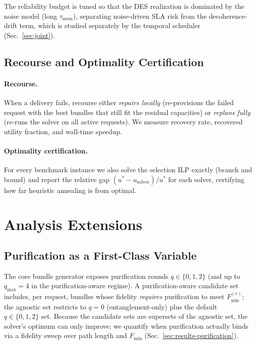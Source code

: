 \documentclass[10pt,a4paper]{article}
\begin{document}
The reliability budget is tuned so that the DES realization is
dominated by the noise model (long $\tau_{\text{mem}}$), separating
noise-driven SLA risk from the decoherence-drift term, which is
studied separately by the temporal scheduler (Sec.~\ref{sec:joint}).

\subsection{Recourse and Optimality Certification}
\label{sec:recourse-opt}

\paragraph{Recourse.}
When a delivery fails, recourse either \emph{repairs locally}
(re-provisions the failed request with the best bundles that still fit
the residual capacities) or \emph{replans fully} (re-runs the solver
on all active requests).  We measure recovery rate, recovered utility
fraction, and wall-time speedup.

\paragraph{Optimality certification.}
For every benchmark instance we also solve the selection ILP exactly
(branch and bound) and report the relative gap
$(u^\ast - u_{\text{solver}})/u^\ast$ for each solver, certifying how
far heuristic annealing is from optimal.

\section{Analysis Extensions}
\label{sec:extensions}

\subsection{Purification as a First-Class Variable}
\label{sec:purification}

The core bundle generator exposes purification rounds $q \in \{0,1,2\}$
(and up to $q_{\max}=4$ in the purification-aware regime).  A
purification-aware candidate set includes, per request, bundles whose
fidelity \emph{requires} purification to meet $F_{\min}^{(r)}$; the
agnostic set restricts to $q=0$ (entanglement-only) plus the default
$q\in\{0,1,2\}$ set.  Because the candidate sets are supersets of the
agnostic set, the solver's optimum can only improve; we quantify when
purification actually binds via a fidelity sweep over path length and
$F_{\min}$ (Sec.~\ref{sec:results-purification}).
\end{document}

